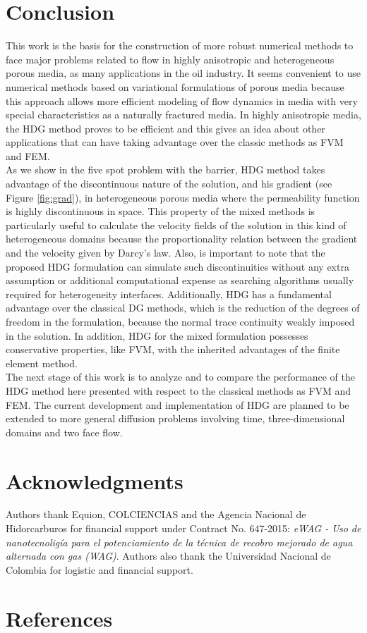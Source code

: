 \documentclass[review]{elsarticle}
\begin{document}
\section{Conclusion}
This work is the basis for the construction of more robust numerical methods to face major problems related to flow in highly anisotropic and heterogeneous porous media, as many applications in the oil industry. It seems convenient to use numerical methods based on variational formulations of porous media because this approach allows more efficient modeling of flow dynamics in media with very special characteristics as a naturally fractured media. In highly anisotropic media, the HDG method proves to be efficient and this gives an idea about other applications that can have taking advantage over the classic methods as FVM and FEM. \\

As we show in the five spot problem with the barrier, HDG method takes advantage of the discontinuous nature of the solution, and his gradient (see Figure \ref{fig:grad}), in heterogeneous porous media where the permeability function is highly discontinuous in space. This property of the mixed methods is particularly useful to calculate the velocity fields of the solution in this kind of heterogeneous domains because the proportionality relation between the gradient and the velocity given by Darcy's law. Also, is important to note that the proposed HDG formulation can simulate such discontinuities without any extra assumption or additional computational expense as searching algorithms usually required for heterogeneity interfaces.
Additionally, HDG has a fundamental advantage over the classical DG methods, which is the reduction of the degrees of freedom in the formulation, because the normal trace continuity weakly imposed in the solution. In addition, HDG for the mixed formulation possesses conservative properties, like FVM, with the inherited advantages of the finite element method.\\

The next stage of this work is to analyze and to compare the performance of the HDG method here presented with respect to the classical methods as FVM and FEM. The current development and implementation of HDG are planned to be extended to more general diffusion problems involving time, three-dimensional domains and two face flow. 

\section*{Acknowledgments}
Authors thank Equion, COLCIENCIAS and the Agencia Nacional de Hidorcarburos for
financial support under Contract No. 647-2015: \textit{eWAG - Uso de nanotecnolig\'ia para el potenciamiento de la t\'ecnica de recobro mejorado de agua alternada con gas (WAG)}. Authors also thank the Universidad Nacional de Colombia for logistic and financial support.

\section*{References}


\end{document}
